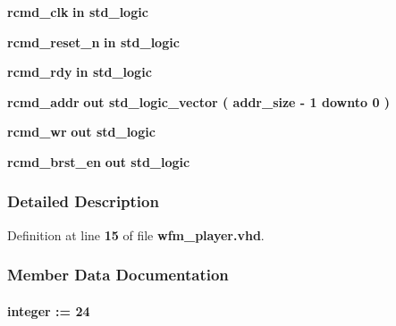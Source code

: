 \begin{DoxyCompactItemize}
\item 
{\bf rcmd\+\_\+clk}  {\bfseries {\bfseries \textcolor{keywordflow}{in}\textcolor{vhdlchar}{ }}} {\bfseries \textcolor{comment}{std\+\_\+logic}\textcolor{vhdlchar}{ }} 
\item 
{\bf rcmd\+\_\+reset\+\_\+n}  {\bfseries {\bfseries \textcolor{keywordflow}{in}\textcolor{vhdlchar}{ }}} {\bfseries \textcolor{comment}{std\+\_\+logic}\textcolor{vhdlchar}{ }} 
\item 
{\bf rcmd\+\_\+rdy}  {\bfseries {\bfseries \textcolor{keywordflow}{in}\textcolor{vhdlchar}{ }}} {\bfseries \textcolor{comment}{std\+\_\+logic}\textcolor{vhdlchar}{ }} 
\item 
{\bf rcmd\+\_\+addr}  {\bfseries {\bfseries \textcolor{keywordflow}{out}\textcolor{vhdlchar}{ }}} {\bfseries \textcolor{comment}{std\+\_\+logic\+\_\+vector}\textcolor{vhdlchar}{ }\textcolor{vhdlchar}{(}\textcolor{vhdlchar}{ }\textcolor{vhdlchar}{ }\textcolor{vhdlchar}{ }\textcolor{vhdlchar}{ }{\bfseries {\bf addr\+\_\+size}} \textcolor{vhdlchar}{-\/}\textcolor{vhdlchar}{ } \textcolor{vhdldigit}{1} \textcolor{vhdlchar}{ }\textcolor{keywordflow}{downto}\textcolor{vhdlchar}{ }\textcolor{vhdlchar}{ } \textcolor{vhdldigit}{0} \textcolor{vhdlchar}{ }\textcolor{vhdlchar}{)}\textcolor{vhdlchar}{ }} 
\item 
{\bf rcmd\+\_\+wr}  {\bfseries {\bfseries \textcolor{keywordflow}{out}\textcolor{vhdlchar}{ }}} {\bfseries \textcolor{comment}{std\+\_\+logic}\textcolor{vhdlchar}{ }} 
\item 
{\bf rcmd\+\_\+brst\+\_\+en}  {\bfseries {\bfseries \textcolor{keywordflow}{out}\textcolor{vhdlchar}{ }}} {\bfseries \textcolor{comment}{std\+\_\+logic}\textcolor{vhdlchar}{ }} 
\end{DoxyCompactItemize}


\subsubsection{Detailed Description}


Definition at line {\bf 15} of file {\bf wfm\+\_\+player.\+vhd}.



\subsubsection{Member Data Documentation}
\paragraph[{addr\+\_\+size}]{ {\bfseries \textcolor{vhdlchar}{ }} {\bfseries \textcolor{comment}{integer}\textcolor{vhdlchar}{ }\textcolor{vhdlchar}{ }\textcolor{vhdlchar}{\+:}\textcolor{vhdlchar}{=}\textcolor{vhdlchar}{ }\textcolor{vhdlchar}{ } \textcolor{vhdldigit}{24} \textcolor{vhdlchar}{ }} \hspace{0.3cm}{\ttfamily [Generic]}}\label{classwfm__player_aafb0d946e5259c516e95eed0224fc8e6}


